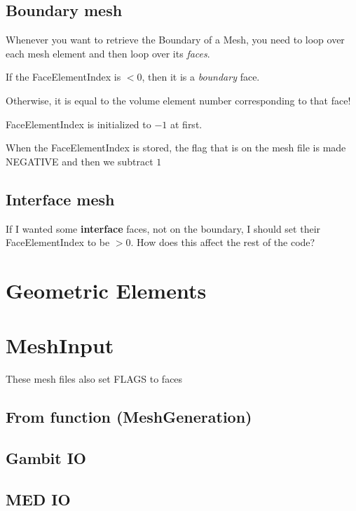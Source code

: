 \documentclass[10pt]{book}
\begin{document}
  
  \subsection{Boundary mesh}
    
    Whenever you want to retrieve the Boundary of a Mesh,
    you need to loop over each mesh element
    and then loop over its \textit{faces}.
    
    If the FaceElementIndex is $ < 0 $, then it is a \textit{boundary} face.
    
    Otherwise, it is equal to the volume element number corresponding to that face!
    
    FaceElementIndex is initialized to $ - 1 $ at first.
    
    When the FaceElementIndex is stored, the flag that is on the mesh file is made NEGATIVE and then we subtract $ 1 $
    
    \subsection{Interface mesh}
    
    If I wanted some \textbf{interface} faces, not on the boundary, I should set their FaceElementIndex to be $ > 0 $.
    How does this affect the rest of the code?
    
  
  \section{Geometric Elements}
  
  
  \section{MeshInput}

  These mesh files also set FLAGS to faces
  
    \subsection{From function (MeshGeneration)}
    
    \subsection{Gambit IO}
    
    \subsection{MED IO}
    
\end{document}
